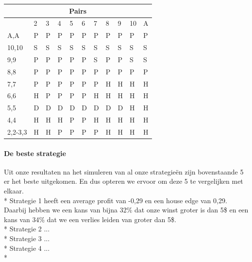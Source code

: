 \documentclass[conference]{IEEEtran}
\begin{document}
\begin{table}[ht]
\begin{tabular}{|l|l|l|l|l|l|l|l|l|l|l|}
\multicolumn{11}{|c|}{\textbf{Pairs}}                                 \\ \hline
                             & 2 & 3 & 4 & 5 & 6 & 7 & 8 & 9 & 10 & A \\ \hline
A,A                          & P & P & P & P & P & P & P & P & P & P  \\ \hline
10,10                        & S & S & S & S & S & S & S & S & S & S  \\ \hline
9,9                          & P & P & P & P & P & S & P & P & S & S  \\ \hline
8,8                          & P & P & P & P & P & P & P & P & P & P  \\ \hline
7,7                          & P & P & P & P & P & P & H & H & H & H  \\ \hline
6,6                          & H & P & P & P & P & H & H & H & H & H  \\ \hline
5,5                          & D & D & D & D & D & D & D & D & H & H  \\ \hline
4,4                          & H & H & H & P & P & H & H & H & H & H  \\ \hline
2,2-3,3                      & H & H & P & P & P & P & H & H & H & H  \\ \hline
\end{tabular}
\end{table}

\paragraph{De beste strategie}

Uit onze resultaten na het simuleren van al onze strategie\"en zijn bovenstaande 5 er het beste uitgekomen. En dus opteren we ervoor om deze 5 te vergelijken met elkaar. \\*
Strategie 1 heeft een average profit van -0,29 en een house edge van 0,29. Daarbij hebben we een kans van bijna 32\% dat onze winst groter is dan 5\$ en een kans van 34\% dat we een verlies leiden van groter dan 5\$. \\*
Strategie 2 ... \\*
Strategie 3 ... \\*
Strategie 4 ... \\*
\end{document}

